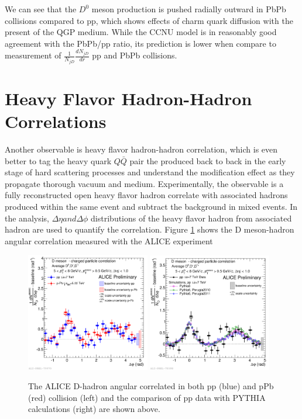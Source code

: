 We can see that the $D^0$ meson production is pushed radially outward in PbPb collisions compared to pp, which shows effects of charm quark diffusion with the present of the QGP medium. While the CCNU model is in reasonably good agreement with the PbPb/pp ratio, its prediction is lower when compare to measurement of $\frac{1}{N_{jD}}\frac{dN_{jD}}{dr}$ pp and PbPb collisions.

\section{Heavy Flavor Hadron-Hadron Correlations}

Another observable is heavy flavor hadron-hadron correlation, which is even better to tag the heavy quark $Q\bar Q$ pair the produced back to back in the early stage of hard scattering processes and understand the modification effect as they propagate thorough vacuum and medium. Experimentally, the observable is a fully reconstructed open heavy flavor hadron correlate with associated hadrons produced within the same event and subtract the background in mixed events. In the analysis, $\Delta \eta and \Delta \phi$ distributions of the heavy flavor hadron from associated hadron are used to quantify the correlation. Figure \ref{ALICEDHadron} shows the D meson-hadron angular correlation measured with the ALICE experiment \cite{DHadronRef}


\begin{figure}[hbtp]
\begin{center}
\includegraphics[width=0.48\textwidth]{Figures/Chapter2/ALICEDHadron.png}
\includegraphics[width=0.48\textwidth]{Figures/Chapter2/ALICEDHadronPP.png}
\caption{The ALICE D-hadron angular correlated in both pp (blue) and pPb (red) collision (left) and the comparison of pp data with PYTHIA calculations (right) are shown above.}
\label{ALICEDHadron}
\end{center}
\end{figure}   

